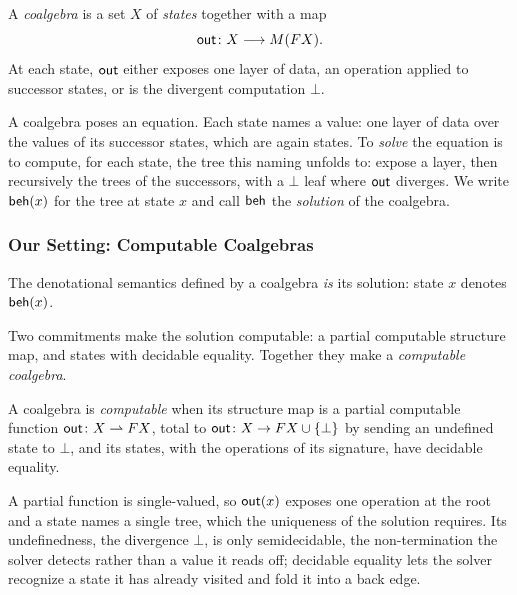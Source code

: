 \begin{definition}[Coalgebra]\label{def:coalgebra}
  A \emph{coalgebra} is a set $X$ of \emph{states} together with a map
  \[
    \mathsf{out} \colon X \longrightarrow M(F X).
  \]
  At each state, $\mathsf{out}$ either exposes one layer of data, an operation applied to successor states, or is the divergent computation $\bot$.
\end{definition}

A coalgebra poses an equation. Each state names a value: one layer of data over the values of its successor states, which are again states. To \emph{solve} the equation is to compute, for each state, the tree this naming unfolds to: expose a layer, then recursively the trees of the successors, with a $\bot$ leaf where $\mathsf{out}$ diverges. We write $\mathsf{beh}(x)$ for the tree at state $x$ and call $\mathsf{beh}$ the \emph{solution} of the coalgebra.

\subsubsection{Our Setting: Computable Coalgebras}

\begin{definition}\label{def:semantics}
  The denotational semantics defined by a coalgebra \emph{is} its solution: state $x$ denotes
  $\mathsf{beh}(x)$.
\end{definition}

\noindent Two commitments make the solution computable: a partial computable structure map, and states with decidable equality. Together they make a \emph{computable coalgebra}.

\begin{definition}\label{def:computable-coalgebra}
  A coalgebra is \emph{computable} when its structure map is a partial computable function $\mathsf{out} \colon X \rightharpoonup F X$, total to $\mathsf{out} \colon X \to F X \cup \{\bot\}$ by sending an undefined state to $\bot$, and its states, with the operations of its signature, have decidable equality.
\end{definition}

\noindent A partial function is single-valued, so $\mathsf{out}(x)$ exposes one operation at the root and a state names a single tree, which the uniqueness of the solution requires. Its undefinedness, the divergence $\bot$, is only semidecidable, the non-termination the solver detects rather than a value it reads off; decidable equality lets the solver recognize a state it has already visited and fold it into a back edge.

